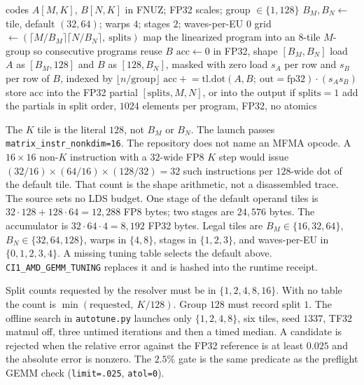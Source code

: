 \documentclass[11pt]{article}
\DeclareRobustCommand{\code}[1]{\texttt{#1}}
\begin{document}
\begin{algorithm}[t]
\caption{Local FNUZ GEMM. Scales are consumed inside the \(K\) loop.}
\label{alg:gemm}
\begin{algorithmic}[1]
\Require codes \(A[M,K]\), \(B[N,K]\) in FNUZ; FP32 scales; group \(\in\{1,128\}\)
\State \(B_M,B_N \leftarrow\) tile, default \((32,64)\); warps \(4\); stages \(2\); waves-per-EU \(0\)
\State grid \(\leftarrow (\lceil M/B_M\rceil\lceil N/B_N\rceil,\ \mathrm{splits})\)
\State map the linearized program into an \(8\)-tile \(M\)-group so consecutive programs reuse \(B\)
\State \(\mathrm{acc}\leftarrow 0\) in FP32, shape \([B_M,B_N]\)
  \State load \(A\) as \([B_M,128]\) and \(B\) as \([128,B_N]\), masked with zero
  \State load \(s_A\) per row and \(s_B\) per row of \(B\), indexed by \(\lfloor n/\mathrm{group}\rfloor\)
  \State \(\mathrm{acc}\mathrel{+}= \mathrm{tl.dot}(A,B;\ \mathrm{out}=\mathrm{fp32})\cdot (s_A s_B)\)
\EndFor
\State store \(\mathrm{acc}\) into the FP32 partial \([\mathrm{splits},M,N]\), or into the output if \(\mathrm{splits}=1\)
  \State add the partials in split order, \(1024\) elements per program, FP32, no atomics
\EndIf
\end{algorithmic}
\end{algorithm}

The \(K\) tile is the literal \(128\), not \(B_M\) or \(B_N\). The launch passes
\code{matrix\_instr\_nonkdim=16}. The repository does not name an MFMA
opcode. A \(16\times 16\) non-\(K\) instruction with a \(32\)-wide FP8 \(K\)
step would issue
\((32/16)\times(64/16)\times(128/32)=32\) such instructions per \(128\)-wide
dot of the default tile. That count is the shape arithmetic, not a
disassembled trace. The source sets no LDS budget. One stage of the default
operand tiles is \(32\cdot 128+128\cdot 64=12{,}288\) FP8 bytes; two stages
are \(24{,}576\) bytes. The accumulator is \(32\cdot 64\cdot 4=8{,}192\) FP32
bytes. Legal tiles are \(B_M\in\{16,32,64\}\), \(B_N\in\{32,64,128\}\),
warps in \(\{4,8\}\), stages in \(\{1,2,3\}\), and waves-per-EU in
\(\{0,1,2,3,4\}\). A missing tuning table selects the default above.
\code{CI1\_AMD\_GEMM\_TUNING} replaces it and is hashed into the runtime
receipt.

Split counts requested by the resolver must be in \(\{1,2,4,8,16\}\). With
no table the count is \(\min(\mathrm{requested},\ K/128)\). Group \(128\)
must record split \(1\). The offline search in \code{autotune.py} launches
only \(\{1,2,4,8\}\), six tiles, seed \(1337\), TF32 matmul off, three
untimed iterations and then a timed median. A candidate is rejected when the
relative error against the FP32 reference is at least \(0.025\) and the
absolute error is nonzero. The \(2.5\%\) gate is the same predicate as the
preflight GEMM check (\code{limit=.025}, \code{atol=0}).
\end{document}
